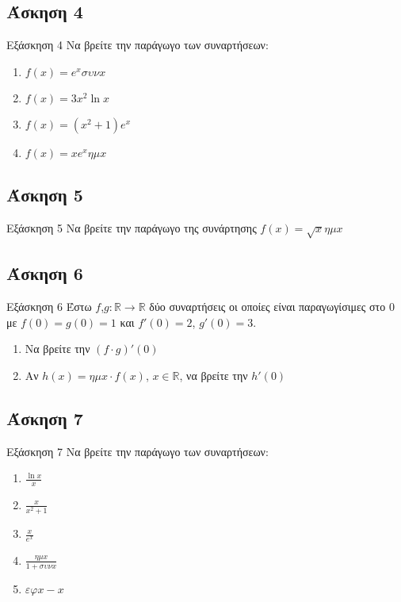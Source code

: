 \documentclass[greek]{beamer}
\begin{document}
\subsection{Άσκηση 4}
\begin{frame}[label=Άσκηση4]{Εξάσκηση 4}
  Να βρείτε την παράγωγο των συναρτήσεων:
  \begin{enumerate}
    \item<1-> $f(x)=e^xσυνx$
    \item<2-> $f(x)=3x^2\ln x$
    \item<3-> $f(x)=(x^2+1)e^x$
    \item<4-> $f(x)=xe^xημx$
  \end{enumerate}

\end{frame}

\subsection{Άσκηση 5}
\begin{frame}[label=Άσκηση5]{Εξάσκηση 5}
  Να βρείτε την παράγωγο της συνάρτησης $f(x)=\sqrt{x}ημx$

\end{frame}

\subsection{Άσκηση 6}
\begin{frame}[label=Άσκηση6]{Εξάσκηση 6}
  Έστω $f$,$g:\mathbb{R}\to\mathbb{R}$ δύο συναρτήσεις οι οποίες είναι παραγωγίσιμες στο $0$ με $f(0)=g(0)=1$ και $f'(0)=2$, $g'(0)=3$.

  \begin{enumerate}
    \item<1-> Να βρείτε την $(f\cdot g)'(0)$
    \item<2-> Αν $h(x)=ημx \cdot f(x)$, $x\in\mathbb{R}$, να βρείτε την $h'(0)$
  \end{enumerate}

\end{frame}

\subsection{Άσκηση 7}
\begin{frame}[label=Άσκηση7]{Εξάσκηση 7}
  Να βρείτε την παράγωγο των συναρτήσεων:
  \begin{enumerate}
    \item<1-> $\frac{\ln x}{x}$
    \item<2-> $\frac{x}{x^2+1}$
    \item<3-> $\frac{x}{e^x}$
    \item<4-> $\frac{ημx}{1+συνx}$
    \item<5-> $εφx-x$
  \end{enumerate}

\end{frame}
\end{document}
